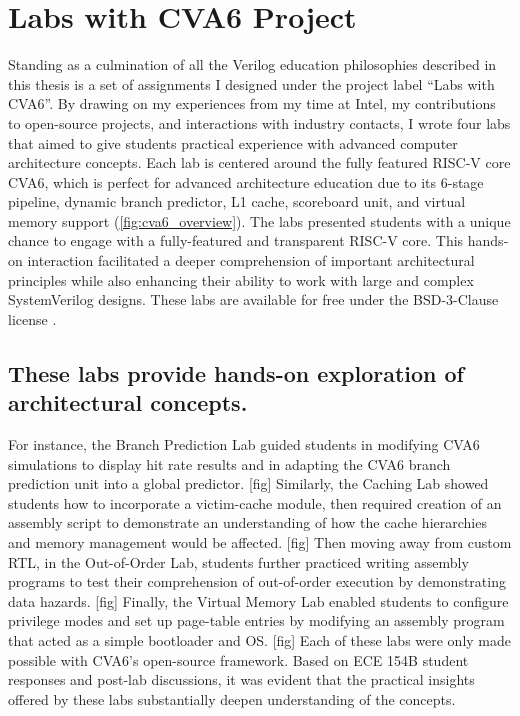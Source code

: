 
\chapter{Labs with CVA6 Project}
\label{chapter:labs_with_cva6}



Standing as a culmination of all the Verilog education philosophies described in this thesis is a set of assignments I designed under the project label ``Labs with CVA6''. By drawing on my experiences from my time at Intel, my contributions to open-source projects, and interactions with industry contacts, I wrote four labs that aimed to give students practical experience with advanced computer architecture concepts. Each lab is centered around the fully featured RISC-V core CVA6, which is perfect for advanced architecture education due to its 6-stage pipeline, dynamic branch predictor, L1 cache, scoreboard unit, and virtual memory support (\autoref{fig:cva6_overview}). The labs presented students with a unique chance to engage with a fully-featured and transparent RISC-V core. This hands-on interaction facilitated a deeper comprehension of important architectural principles while also enhancing their ability to work with large and complex SystemVerilog designs. These labs are available for free under the BSD-3-Clause license \cite{labsWithCVA6}.

\section{These labs provide hands-on exploration of architectural concepts.}

For instance, the Branch Prediction Lab guided students in modifying CVA6 simulations to display hit rate results and in adapting the CVA6 branch prediction unit into a global predictor. [fig] Similarly, the Caching Lab showed students how to incorporate a victim-cache module, then required creation of an assembly script to demonstrate an understanding of how the cache hierarchies and memory management would be affected. [fig] Then moving away from custom RTL, in the Out-of-Order Lab, students further practiced writing assembly programs to test their comprehension of out-of-order execution by demonstrating data hazards. [fig] Finally, the Virtual Memory Lab enabled students to configure privilege modes and set up page-table entries by modifying an assembly program that acted as a simple bootloader and OS. [fig] Each of these labs were only made possible with CVA6's open-source framework. Based on ECE 154B student responses and post-lab discussions, it was evident that the practical insights offered by these labs substantially deepen understanding of the concepts.

